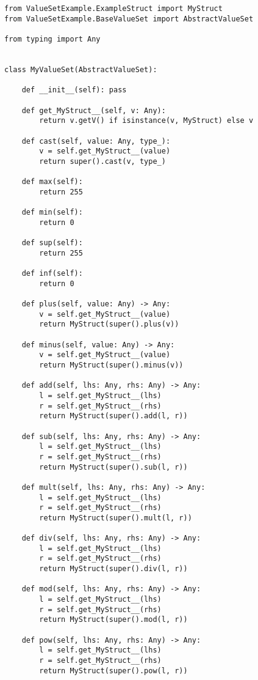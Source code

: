 \begin{verbatim}
from ValueSetExample.ExampleStruct import MyStruct
from ValueSetExample.BaseValueSet import AbstractValueSet

from typing import Any


class MyValueSet(AbstractValueSet):

    def __init__(self): pass

    def get_MyStruct__(self, v: Any):
        return v.getV() if isinstance(v, MyStruct) else v

    def cast(self, value: Any, type_):
        v = self.get_MyStruct__(value)
        return super().cast(v, type_)

    def max(self):
        return 255

    def min(self):
        return 0

    def sup(self):
        return 255

    def inf(self):
        return 0

    def plus(self, value: Any) -> Any:
        v = self.get_MyStruct__(value)
        return MyStruct(super().plus(v))

    def minus(self, value: Any) -> Any:
        v = self.get_MyStruct__(value)
        return MyStruct(super().minus(v))

    def add(self, lhs: Any, rhs: Any) -> Any:
        l = self.get_MyStruct__(lhs)
        r = self.get_MyStruct__(rhs)
        return MyStruct(super().add(l, r))

    def sub(self, lhs: Any, rhs: Any) -> Any:
        l = self.get_MyStruct__(lhs)
        r = self.get_MyStruct__(rhs)
        return MyStruct(super().sub(l, r))

    def mult(self, lhs: Any, rhs: Any) -> Any:
        l = self.get_MyStruct__(lhs)
        r = self.get_MyStruct__(rhs)
        return MyStruct(super().mult(l, r))

    def div(self, lhs: Any, rhs: Any) -> Any:
        l = self.get_MyStruct__(lhs)
        r = self.get_MyStruct__(rhs)
        return MyStruct(super().div(l, r))

    def mod(self, lhs: Any, rhs: Any) -> Any:
        l = self.get_MyStruct__(lhs)
        r = self.get_MyStruct__(rhs)
        return MyStruct(super().mod(l, r))

    def pow(self, lhs: Any, rhs: Any) -> Any:
        l = self.get_MyStruct__(lhs)
        r = self.get_MyStruct__(rhs)
        return MyStruct(super().pow(l, r))
\end{verbatim}

